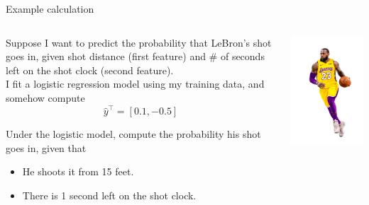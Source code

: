 \documentclass[aspectratio=169]{../latex_main/tntbeamer}  %
\begin{document}
	
	\begin{frame}{Example calculation}
	   
	   \begin{columns}
	    
	   \begin{column}{.6\textwidth}
	    Suppose I want to predict the probability that LeBron’s shot goes in, given shot distance (first feature) and \# of seconds left on the shot clock (second feature).\\
	    \bigskip
	    I fit a logistic regression model using my training data, and somehow compute
	    \begin{equation*}
	        \hat{y}^\intercal = [0.1 , -0.5]
	    \end{equation*}
	    
	   Under the logistic model, compute the probability his shot goes in, given that
	    \begin{itemize}
	        \item He shoots it from 15 feet.
	        \item There is 1 second left on the shot clock.
	    \end{itemize}
	    
	    \end{column}
	    \begin{column}{.4\textwidth}

	            \centering
	            \includegraphics[scale=.9]{Bild7}
	            
	    \end{column}
	    
	    \end{columns}
	\end{frame}
	
\end{document}
